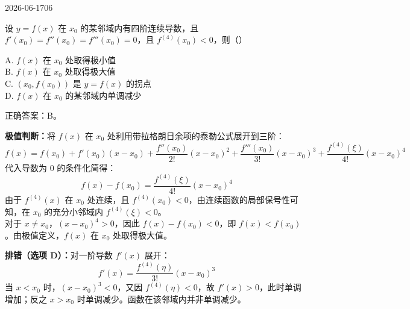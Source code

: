 \begin{mistake}{2026-06-17}{06}

\begin{problemcontent}
设 \(y = f(x)\) 在 \(x_0\) 的某邻域内有四阶连续导数，且 \(f'(x_0) = f''(x_0) = f'''(x_0) = 0\)，且 \(f^{(4)}(x_0) < 0\)，则（\quad）

A. \(f(x)\) 在 \(x_0\) 处取得极小值\\
B. \(f(x)\) 在 \(x_0\) 处取得极大值\\
C. \((x_0, f(x_0))\) 是 \(y = f(x)\) 的拐点\\
D. \(f(x)\) 在 \(x_0\) 的某邻域内单调减少
\end{problemcontent}

\begin{solutioncontent}
正确答案：B。

\textbf{极值判断：}将 \(f(x)\) 在 \(x_0\) 处利用带拉格朗日余项的泰勒公式展开到三阶：
\[ f(x) = f(x_0) + f'(x_0)(x - x_0) + \frac{f''(x_0)}{2!}(x - x_0)^2 + \frac{f'''(x_0)}{3!}(x - x_0)^3 + \frac{f^{(4)}(\xi)}{4!}(x - x_0)^4 \]
代入导数为 \(0\) 的条件化简得：
\[ f(x) - f(x_0) = \frac{f^{(4)}(\xi)}{4!}(x - x_0)^4 \]
由于 \(f^{(4)}(x)\) 在 \(x_0\) 处连续，且 \(f^{(4)}(x_0) < 0\)，由连续函数的局部保号性可知，在 \(x_0\) 的充分小邻域内 \(f^{(4)}(\xi) < 0\)。\\
对于 \(x \neq x_0\)，\((x - x_0)^4 > 0\)，因此 \(f(x) - f(x_0) < 0\)，即 \(f(x) < f(x_0)\)。由极值定义，\(f(x)\) 在 \(x_0\) 处取得极大值。

\textbf{排错（选项 D）：}对一阶导数 \(f'(x)\) 展开：
\[ f'(x) = \frac{f^{(4)}(\eta)}{3!}(x - x_0)^3 \]
当 \(x < x_0\) 时，\((x - x_0)^3 < 0\)，又因 \(f^{(4)}(\eta) < 0\)，故 \(f'(x) > 0\)，此时单调增加；反之 \(x > x_0\) 时单调减少。函数在该邻域内并非单调减少。
\end{solutioncontent}


\end{mistake}
